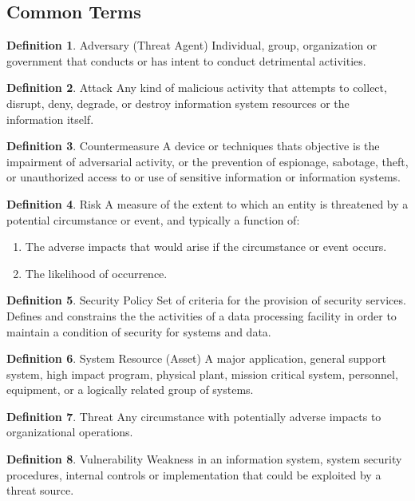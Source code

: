 \documentclass[a4paper]{article}
\theoremstyle{definition}
\newtheorem{definition}{Definition}[section]
\theoremstyle{remark}
\begin{document}
	\subsection{Common Terms}
	\begin{definition}{Adversary (Threat Agent)}
		Individual, group, organization or government that conducts or has intent to
		conduct detrimental activities.
	\end{definition}
	\begin{definition}{Attack}
		Any kind of malicious activity that attempts to collect, disrupt, deny, degrade,
		or destroy information system resources or the information itself.
	\end{definition}
	\begin{definition}{Countermeasure}
		A device or techniques thats objective is the impairment of adversarial activity, or
		the prevention of espionage, sabotage, theft, or unauthorized access to or use of
		sensitive information or information systems.
	\end{definition}
	\begin{definition}{Risk}
		A measure of the extent to which an entity is threatened by a potential circumstance
		or event, and typically a function of:
		\begin{enumerate}
			\item The adverse impacts that would arise if the circumstance or event occurs.
			\item The likelihood of occurrence.
		\end{enumerate}
	\end{definition}
	\begin{definition}{Security Policy}
		Set of criteria for the provision of security services. Defines and constrains the
		the activities of a data processing facility in order to maintain a condition of security
		for systems and data.
	\end{definition}
	\begin{definition}{System Resource (Asset)}
		A major application, general support system, high impact program, physical plant,
		mission critical system, personnel, equipment, or a logically related group of systems.
	\end{definition}
	\begin{definition}{Threat}
		Any circumstance with potentially adverse impacts to organizational operations.
	\end{definition}
	\begin{definition}{Vulnerability}
		Weakness in an information system, system security procedures, internal controls
		or implementation that could be exploited by a threat source.
	\end{definition}
	
\end{document}
